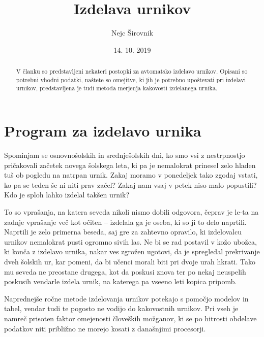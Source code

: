\documentclass[a4paper, 10pt]{article}
\begin{document}

\title{Izdelava urnikov}
\author{Nejc Širovnik}
\date{14. 10. 2019}

\maketitle

\begin{abstract}
   V članku so predstavljeni nekateri postopki za avtomatsko izdelavo urnikov. Opisani so
potrebni vhodni podatki, naštete so omejitve, ki jih je potrebno upoštevati pri izdelavi
urnikov, predstavljena je tudi metoda merjenja kakovosti izdelanega urnika.
\end{abstract}

\section{Program za izdelavo urnika}

Spominjam se osnovnošolskih in srednješolskih dni, ko smo vsi z nestrpnostjo pričakovali
začetek novega šolskega leta, ki pa je nemalokrat prinesel zelo hladen tuš ob pogledu na
natrpan urnik. Zakaj moramo v ponedeljek tako zgodaj vstati, ko pa se teden še ni niti
prav začel? Zakaj nam vsaj v petek niso malo popustili? Kdo je sploh lahko izdelal
takšen urnik?

To so vprašanja, na katera seveda nikoli nismo dobili odgovora, čeprav je le-ta na zadnje
vprašanje več kot očiten \--- izdelala ga je oseba, ki so ji to delo naprtili. Naprtili je
zelo primerna beseda, saj gre za zahtevno opravilo, ki izdelovalcu urnikov nemalokrat
pusti ogromno sivih las. Ne bi se rad postavil v kožo ubožca, ki konča z izdelavo urnika,
nakar ves zgrožen ugotovi, da je spregledal prekrivanje dveh šolskih ur, kar pomeni, da
bi učenci morali biti pri dvoje urah hkrati. Tako mu seveda ne preostane drugega, kot da
poskusi znova ter po nekaj neuspelih poskusih vendarle izdela urnik, na katerega pa vseeno
leti kopica pripomb.

Naprednejše ročne metode izdelovanja urnikov potekajo s pomočjo modelov in tabel, vendar
tudi te pogosto ne vodijo do kakovostnih urnikov. Pri vseh je namreč prisoten faktor
omejenosti človeških možganov, ki se po hitrosti obdelave podatkov niti približno ne
morejo kosati z današnjimi procesorji.
\end{document}
